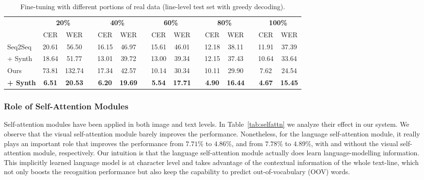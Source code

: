 \documentclass[10pt,twocolumn,letterpaper]{article}
\begin{document}
\begin{table*}[t!h]
    \caption{Fine-tuning with different portions of real data (line-level test set with greedy decoding).}
    \label{tab:fine}
    \centering
\begin{tabular}{lcccccccccccccc}
    \toprule
      & \multicolumn{2}{c}{\textbf{20\%}} && \multicolumn{2}{c}{\textbf{40\%}} && \multicolumn{2}{c}{\textbf{60\%}} && \multicolumn{2}{c}{\textbf{80\%}}&& \multicolumn{2}{c}{\textbf{100\%}}\\
    \cmidrule{2-3}\cmidrule{5-6}\cmidrule{8-9}\cmidrule{11-12}\cmidrule{14-15}
    & CER & WER && CER & WER && CER & WER && CER & WER && CER & WER\\
    \midrule
    Seq2Seq  & 20.61 & 56.50 && 16.15 & 46.97 && 15.61 & 46.01 && 12.18 & 38.11 && 11.91 & 37.39\\
    + Synth & 18.64 & 51.77 && 13.01 & 39.72 && 13.00 & 39.34  && 12.15 & 37.43 && 10.64 & 33.64 \\
    \midrule
    Ours & 73.81 & 132.74 && 17.34 & 42.57 && 10.14 & 30.34 && 10.11 & 29.90 && 7.62 & 24.54\\
    \textbf{+ Synth} & \textbf{6.51} & \textbf{20.53} && \textbf{6.20} & \textbf{19.69} && \textbf{5.54} & \textbf{17.71} && \textbf{4.90} & \textbf{16.44} && \textbf{4.67} & \textbf{15.45}\\
    \bottomrule
    \end{tabular}
\end{table*}

\subsubsection{Role of Self-Attention Modules}
Self-attention modules have been applied in both image and text levels. In Table~\ref{tab:selfattn} we analyze their effect in our system. We observe that the visual self-attention module barely improves the performance. Nonetheless, for the language self-attention module, it really plays an important role that improves the performance from $7.71\%$ to $4.86\%$, and from $7.78\%$ to $4.89\%$, with and without the visual self-attention module, respectively. Our intuition is that the language self-attention module actually does learn language-modelling information. This implicitly learned language model is at character level and takes advantage of the contextual information of the whole text-line, which not only boosts the recognition performance but also keep the capability to predict out-of-vocabulary (OOV) words.
\end{document}
